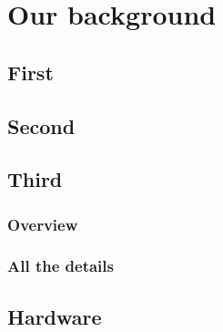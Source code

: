 \chapter{Our background}


\section{First}

\section{Second}


\section{Third}
\subsection{Overview}


\subsection{All the details}

\section{Hardware}


\section{}
